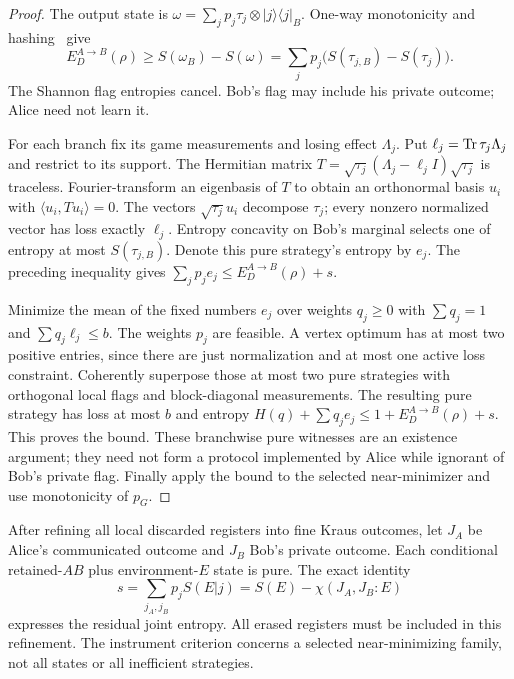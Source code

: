 \begin{proof}
The output state is $\omega=\sum_jp_j\tau_j\otimes|j\rangle\langle j|_B$. One-way monotonicity and hashing~\cite{DW05} give
\[
 E_D^{A\to B}(\rho)\ge S(\omega_B)-S(\omega)
   =\sum_jp_j\bigl(S(\tau_{j,B})-S(\tau_j)\bigr).
\]
The Shannon flag entropies cancel. Bob's flag may include his private outcome; Alice need not learn it.

For each branch fix its game measurements and losing effect $\Lambda_j$. Put $\ell_j=\operatorname{Tr}\tau_j\Lambda_j$ and restrict to its support. The Hermitian matrix $T=\sqrt{\tau_j}(\Lambda_j-\ell_jI)\sqrt{\tau_j}$ is traceless. Fourier-transform an eigenbasis of $T$ to obtain an orthonormal basis $u_i$ with $\langle u_i,Tu_i\rangle=0$. The vectors $\sqrt{\tau_j}u_i$ decompose $\tau_j$; every nonzero normalized vector has loss exactly $\ell_j$. Entropy concavity on Bob's marginal selects one of entropy at most $S(\tau_{j,B})$. Denote this pure strategy's entropy by $e_j$. The preceding inequality gives $\sum_jp_je_j\le E_D^{A\to B}(\rho)+s$.

Minimize the mean of the fixed numbers $e_j$ over weights $q_j\ge0$ with $\sum q_j=1$ and $\sum q_j\ell_j\le b$. The weights $p_j$ are feasible. A vertex optimum has at most two positive entries, since there are just normalization and at most one active loss constraint. Coherently superpose those at most two pure strategies with orthogonal local flags and block-diagonal measurements. The resulting pure strategy has loss at most $b$ and entropy $H(q)+\sum q_je_j\le1+E_D^{A\to B}(\rho)+s$. This proves the bound. These branchwise pure witnesses are an existence argument; they need not form a protocol implemented by Alice while ignorant of Bob's private flag. Finally apply the bound to the selected near-minimizer and use monotonicity of $p_G$.
\end{proof}

After refining all local discarded registers into fine Kraus outcomes, let $J_A$ be Alice's communicated outcome and $J_B$ Bob's private outcome. Each conditional retained-$AB$ plus environment-$E$ state is pure. The exact identity
\[
 s=\sum_{j_A,j_B}p_jS(E|j)=S(E)-\chi(J_A,J_B:E)
\]
expresses the residual joint entropy. All erased registers must be included in this refinement. The instrument criterion concerns a selected near-minimizing family, not all states or all inefficient strategies.

